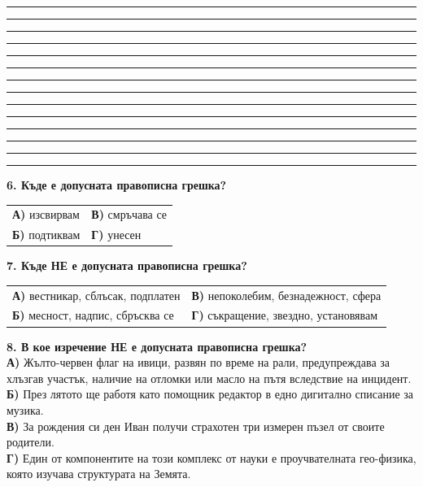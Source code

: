 \documentclass[12pt,a4paper]{article}
\begin{document}
\vspace{0.3cm}
\noindent\rule{\linewidth}{0.4pt}
\noindent\rule{\linewidth}{0.4pt}
\noindent\rule{\linewidth}{0.4pt}
\noindent\rule{\linewidth}{0.4pt}
\noindent\rule{\linewidth}{0.4pt}
\noindent\rule{\linewidth}{0.4pt}
\noindent\rule{\linewidth}{0.4pt}
\noindent\rule{\linewidth}{0.4pt}
\noindent\rule{\linewidth}{0.4pt}
\noindent\rule{\linewidth}{0.4pt}
\noindent\rule{\linewidth}{0.4pt}
\noindent\rule{\linewidth}{0.4pt}
\noindent\rule{\linewidth}{0.4pt}
\noindent\rule{\linewidth}{0.4pt}

\vspace{0.6cm}

\noindent
\textbf{6. Къде е допусната правописна грешка?} \\
\begin{tabular}{@{}p{} p{}@{}}
\textbf{А)} изсвирвам & \textbf{В)} смръчава се \\
\textbf{Б)} подтиквам & \textbf{Г)} унесен
\end{tabular}

\vspace{0.6cm}

\noindent
\textbf{7. Къде НЕ е допусната правописна грешка?} \\
\begin{tabular}{@{}p{} p{}@{}}
\textbf{А)} вестникар, сблъсак, подплатен & \textbf{В)} непоколебим, безнадежност, сфера \\
\textbf{Б)} месност, надпис, сбръсква се & \textbf{Г)} съкращение, звездно, установявам
\end{tabular}

\vspace{0.6cm}

\noindent
\textbf{8. В кое изречение НЕ е допусната правописна грешка?} \\
\textbf{А)} Жълто-червен флаг на ивици, развян по време на рали, предупреждава за хлъзгав участък, наличие на отломки или масло на пътя вследствие на инцидент. \\
\textbf{Б)} През лятото ще работя като помощник редактор в едно дигитално списание за музика. \\
\textbf{В)} За рождения си ден Иван получи страхотен три измерен пъзел от своите родители. \\
\textbf{Г)} Един от компонентите на този комплекс от науки е проучвателната гео-физика, която изучава структурата на Земята.

\vspace{0.6cm}
\end{document}
